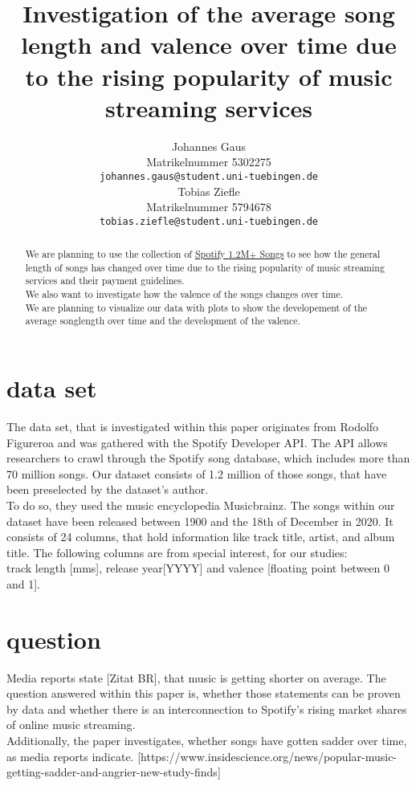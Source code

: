 \documentclass{article}
\title{Investigation of the average song length and valence over time due to the rising popularity of music streaming services}
\author{%
  Johannes Gaus\\
  Matrikelnummer 5302275\\
  \texttt{johannes.gaus@student.uni-tuebingen.de} \\
  \And
  Tobias Ziefle\\
  Matrikelnummer 5794678\\
  \texttt{tobias.ziefle@student.uni-tuebingen.de} \\
}
\begin{document}
\maketitle

\begin{abstract}
 We are planning to use the collection of  \href{https://www.kaggle.com/rodolfofigueroa/spotify-12m-songs}{Spotify 1.2M+ Songs} to see how the general length of songs has changed over time due to the rising popularity of music streaming services and their payment guidelines.\\
 We also want to investigate how the valence of the songs changes over time.\\  
 We are planning to visualize our data with plots to show the developement of the average songlength over time and  the development of the valence.
\end{abstract}

\newpage

\section{data set}
The data set, that is investigated within this paper originates from Rodolfo Figureroa and was gathered with the Spotify Developer API. The API allows researchers to crawl through the Spotify song database, which includes more than 70 million songs. Our dataset consists of 1.2 million of those songs, that have been preselected by the dataset's author.\\
To do so, they used the music encyclopedia \glqq Musicbrainz\grqq. The songs within our dataset have been released between 1900 and the 18th of December in 2020. It consists of 24 columns, that hold information like track title, artist, and album title. The following columns are from special interest, for our studies:\\
track length [mms], release year[YYYY] and valence [floating point between 0 and 1].

\section{question}
Media reports state [Zitat BR], that music is getting shorter on average. The question answered within this paper is, whether those statements can be proven by data and whether there is an interconnection to Spotify's rising market shares of online music streaming. \\
Additionally, the paper investigates, whether songs have gotten sadder over time, as media reports indicate. [https://www.insidescience.org/news/popular-music-getting-sadder-and-angrier-new-study-finds] 
\end{document}

